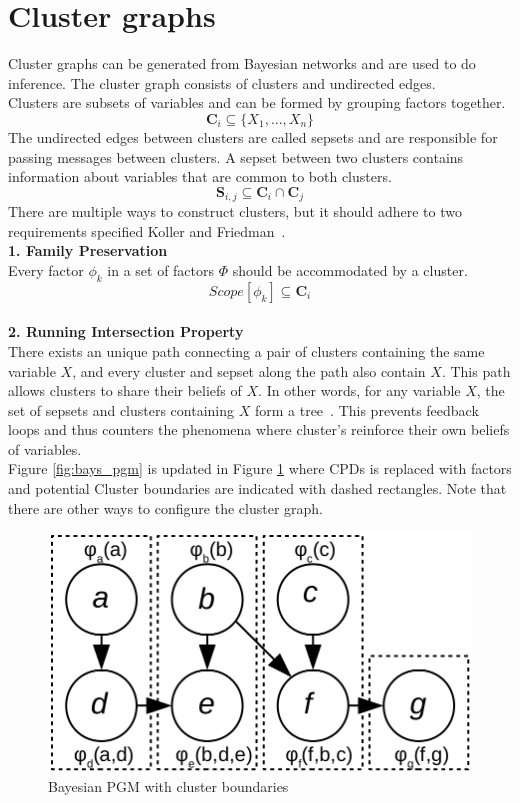 \documentclass[12pt,oneside,openany,a4paper, %
afrikaans,english,
]{memoir}
\numberwithin{equation}{chapter}
\begin{document}
\section{Cluster graphs}
Cluster graphs can be generated from Bayesian networks and are used to do inference. The cluster graph consists of clusters and undirected edges.\\Clusters are subsets of variables and can be formed by grouping factors together.\\
\begin{equation}
\bm{C}_i \subseteq \{X_1, ..., X_n\}
\end{equation}
The undirected edges between clusters are called sepsets and are responsible for passing messages between clusters. A sepset between two clusters contains information about variables that are common to both clusters.
\begin{equation}
\bm{S}_{i,j} \subseteq \bm{C}_i \cap \bm{C}_j
\end{equation}
There are multiple ways to construct clusters, but it should adhere to two requirements specified Koller and Friedman~\citep{koller}.\\
\textbf{1. Family Preservation}\\
Every factor $\phi_k$ in a set of factors $\Phi$ should be accommodated by a cluster.
\begin{equation}
Scope[{\phi}_k] \subseteq \bm{C}_i
\end{equation}\\
\textbf{2. Running Intersection Property}\\
There exists an unique path connecting a pair of clusters containing the same variable $X$, and every cluster and sepset along the path also contain $X$. This path allows clusters to share their beliefs of $X$. In other words, for any variable $X$, the set of sepsets and clusters containing $X$ form a tree~\citep{koller}. This prevents feedback loops and thus counters the phenomena where cluster's reinforce their own beliefs of variables.\\
Figure \ref{fig:bays_pgm} is updated in Figure \ref{fig:cluster_bound} where CPDs is replaced with factors and potential Cluster boundaries are indicated with dashed rectangles. Note that there are other ways to configure the cluster graph.
\begin{figure}[H]
  \includegraphics[width=0.6\linewidth]{Figures/cluster_divisions.png}
  \centering
  \caption{Bayesian PGM with cluster boundaries}
  \label{fig:cluster_bound}
\end{figure}
\end{document}
